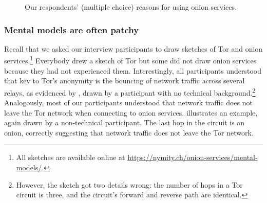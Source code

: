 \begin{figure}[t]
    \centering
    
    \caption{Our respondents' (multiple choice) reasons for using onion
    services.}
    \label{fig:onion-usage}
\end{figure}

\subsubsection{Mental models are often patchy}
\label{sec:mental-models}

Recall that we asked our interview participants to draw sketches of Tor and
onion services.\footnote{All sketches are available online at
\url{https://nymity.ch/onion-services/mental-models/}.}   Everybody drew a
sketch of Tor but some did not draw onion services because they had not
experienced them.  Interestingly, all participants understood that key to Tor's
anonymity is the bouncing of network traffic across several relays, as evidenced
by , drawn by a participant with no technical
background.\footnote{However, the sketch got two details wrong: the number of
hops in a Tor circuit is three, and the circuit's forward and reverse path are
identical.} Analogously, most of our participants understood that network
traffic does not leave the Tor network when connecting to onion services.
 illustrates an example, again drawn by a non-technical
participant.  The last hop in the circuit is an onion, correctly suggesting that
network traffic does not leave the Tor network.

